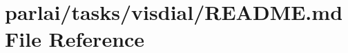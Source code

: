 \hypertarget{parlai_2tasks_2visdial_2README_8md}{}\section{parlai/tasks/visdial/\+R\+E\+A\+D\+ME.md File Reference}
\label{parlai_2tasks_2visdial_2README_8md}
